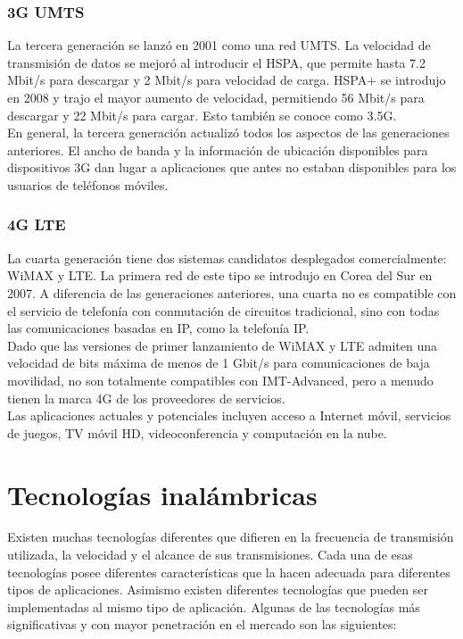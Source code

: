 		\subsubsection{3G UMTS}
		La tercera generación se lanzó en 2001 como una red UMTS. La velocidad de transmisión de datos se mejoró al introducir el HSPA, que permite hasta 7.2 Mbit/s para descargar y 2 Mbit/s para velocidad de carga. HSPA+ se introdujo en 2008 y trajo el mayor aumento de velocidad, permitiendo 56 Mbit/s para descargar y 22 Mbit/s para cargar. Esto también se conoce como 3.5G. \\
		
		En general, la tercera generación actualizó todos los aspectos de las generaciones anteriores. El ancho de banda y la información de ubicación disponibles para dispositivos 3G dan lugar a aplicaciones que antes no estaban disponibles para los usuarios de teléfonos móviles. \cite{2g3g4g}
		
		\subsubsection{4G LTE}
		La cuarta generación tiene dos sistemas candidatos desplegados comercialmente: WiMAX y LTE. La primera red de este tipo se introdujo en Corea del Sur en 2007. A diferencia de las generaciones anteriores, una cuarta no es compatible con el servicio de telefonía con conmutación de circuitos tradicional, sino con todas las comunicaciones basadas en IP, como la telefonía IP. \\
		
		Dado que las versiones de primer lanzamiento de WiMAX y LTE admiten una velocidad de bits máxima de menos de  1 Gbit/s para comunicaciones de baja movilidad, no son totalmente compatibles con IMT-Advanced, pero a menudo tienen la marca 4G de los proveedores de servicios. \\
		
		Las aplicaciones actuales y potenciales incluyen acceso a Internet móvil, servicios de juegos, TV móvil HD, videoconferencia y computación en la nube. \cite{2g3g4g}
	

	\section{Tecnologías inalámbricas}
	Existen muchas tecnologías diferentes que difieren en la frecuencia de transmisión utilizada, la velocidad y el alcance de sus transmisiones. Cada una de esas tecnologías posee diferentes características que la hacen adecuada para diferentes tipos de aplicaciones. Asimismo existen diferentes tecnologías que pueden ser implementadas al mismo tipo de aplicación. Algunas de las tecnologías más significativas y con mayor penetración en el mercado son las siguientes:
	
